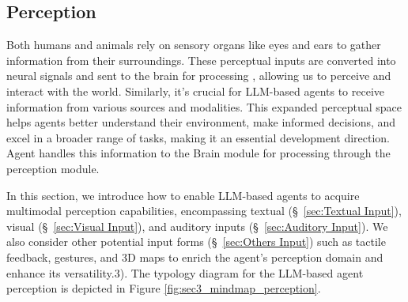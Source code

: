 \subsection{Perception}\label{sec:Perception}



Both humans and animals rely on sensory organs like eyes and ears to gather information from their surroundings. These perceptual inputs are converted into neural signals and sent to the brain for processing \cite{hubel1962receptive,logothetis1996visual}, allowing us to perceive and interact with the world. Similarly, it's crucial for LLM-based agents to receive information from various sources and modalities. This expanded perceptual space helps agents better understand their environment, make informed decisions, and excel in a broader range of tasks, making it an essential development direction. Agent handles this information to the Brain module for processing through the perception module.

In this section, we introduce how to enable LLM-based agents to acquire multimodal perception capabilities, encompassing textual (\S \ \ref{sec:Textual Input}), visual (\S \ \ref{sec:Visual Input}), and auditory inputs (\S \ \ref{sec:Auditory Input}). We also consider other potential input forms (\S \ \ref{sec:Others Input}) such as tactile feedback, gestures, and 3D maps to enrich the agent's perception domain and enhance its versatility.3). The typology diagram for the
LLM-based agent perception is depicted in Figure \ref{fig:sec3_mindmap_perception}.


